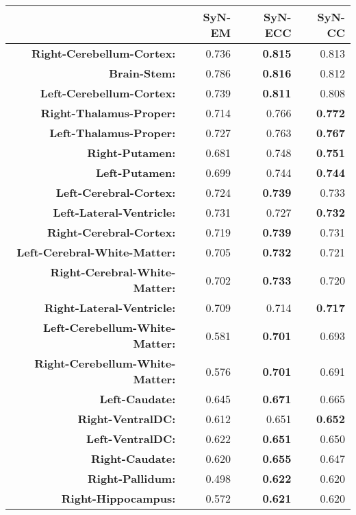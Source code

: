 \begin{table}[htbp]
  {\small
  \centering
    \begin{tabular}{rrrr}
    \toprule
    \textbf{} & \textbf{SyN-EM} & \textbf{SyN-ECC} & \textbf{SyN-CC} \\
    \midrule
    \textbf{Right-Cerebellum-Cortex:} & 0.736 & \textbf{0.815} & 0.813 \\
    \textbf{Brain-Stem:} & 0.786 & \textbf{0.816} & 0.812 \\
    \textbf{Left-Cerebellum-Cortex:} & 0.739 & \textbf{0.811} & 0.808 \\
    \textbf{Right-Thalamus-Proper:} & 0.714 & 0.766 & \textbf{0.772} \\
    \textbf{Left-Thalamus-Proper:} & 0.727 & 0.763 & \textbf{0.767} \\
    \textbf{Right-Putamen:} & 0.681 & 0.748 & \textbf{0.751} \\
    \textbf{Left-Putamen:} & 0.699 & 0.744 & \textbf{0.744} \\
    \textbf{Left-Cerebral-Cortex:} & 0.724 & \textbf{0.739} & 0.733 \\
    \textbf{Left-Lateral-Ventricle:} & 0.731 & 0.727 & \textbf{0.732} \\
    \textbf{Right-Cerebral-Cortex:} & 0.719 & \textbf{0.739} & 0.731 \\
    \textbf{Left-Cerebral-White-Matter:} & 0.705 & \textbf{0.732} & 0.721 \\
    \textbf{Right-Cerebral-White-Matter:} & 0.702 & \textbf{0.733} & 0.720 \\
    \textbf{Right-Lateral-Ventricle:} & 0.709 & 0.714 & \textbf{0.717} \\
    \textbf{Left-Cerebellum-White-Matter:} & 0.581 & \textbf{0.701} & 0.693 \\
    \textbf{Right-Cerebellum-White-Matter:} & 0.576 & \textbf{0.701} & 0.691 \\
    \textbf{Left-Caudate:} & 0.645 & \textbf{0.671} & 0.665 \\
    \textbf{Right-VentralDC:} & 0.612 & 0.651 & \textbf{0.652} \\
    \textbf{Left-VentralDC:} & 0.622 & \textbf{0.651} & 0.650 \\
    \textbf{Right-Caudate:} & 0.620 & \textbf{0.655} & 0.647 \\
    \textbf{Right-Pallidum:} & 0.498 & \textbf{0.622} & 0.620 \\
    \textbf{Right-Hippocampus:} & 0.572 & \textbf{0.621} & 0.620 \\

\end{tabular}}
\end{table}
